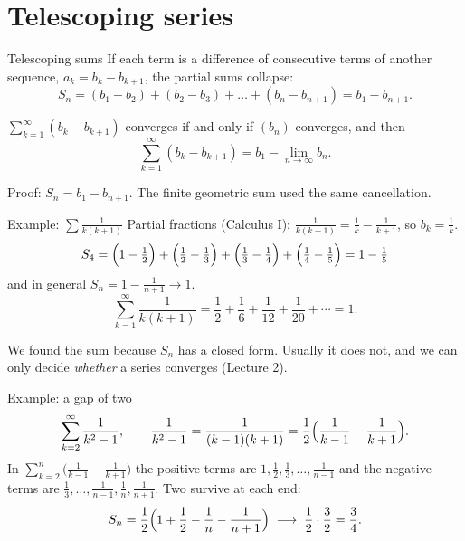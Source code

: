 \documentclass{wosm-slides}
\begin{document}
\section{Telescoping series}

\begin{frame}{Telescoping sums}
  If each term is a difference of consecutive terms of another sequence,
  $a_k = b_k - b_{k+1}$, the partial sums collapse:
  \[ S_n = (b_1 - b_2) + (b_2 - b_3) + \dots + (b_n - b_{n+1}) = b_1 - b_{n+1} . \]
  \pause
  \begin{theorem}
    $\sum_{k=1}^\infty (b_k - b_{k+1})$ converges if and only if $(b_n)$ converges, and then
    \[ \sum_{k=1}^\infty (b_k - b_{k+1}) = b_1 - \lim_{n\to\infty} b_n . \]
  \end{theorem}
  {\small Proof: $S_n = b_1 - b_{n+1}$. \quad
  The finite geometric sum used the same cancellation.\par}
\end{frame}

\begin{frame}{Example: $\sum \frac{1}{k(k+1)}$}
  Partial fractions (Calculus I): \quad
  $\displaystyle\frac{1}{k(k+1)} = \frac1k - \frac1{k+1}$, \quad so $b_k = \frac1k$.
  \pause
  \[ S_4 = \Bigl(1 - \tfrac12\Bigr) + \Bigl(\tfrac12 - \tfrac13\Bigr)
         + \Bigl(\tfrac13 - \tfrac14\Bigr) + \Bigl(\tfrac14 - \tfrac15\Bigr)
         = 1 - \tfrac15 \]
  and in general $S_n = 1 - \frac{1}{n+1} \to 1$.
  \pause
  \[ \sum_{k=1}^\infty \frac{1}{k(k+1)} = \frac12 + \frac16 + \frac1{12} + \frac1{20} + \cdots = 1 . \]
  {\small\color{wosm-muted} We found the sum because $S_n$ has a closed form. Usually it does
  not, and we can only decide \emph{whether} a series converges (Lecture 2).\par}
\end{frame}

\begin{frame}{Example: a gap of two}
  \[ \sum_{k=2}^\infty \frac{1}{k^2 - 1}, \qquad
     \frac{1}{k^2-1} = \frac{1}{(k-1)(k+1)} = \frac12\Bigl(\frac{1}{k-1} - \frac{1}{k+1}\Bigr). \]
  \pause
  In $\sum_{k=2}^{n} \bigl(\frac{1}{k-1} - \frac{1}{k+1}\bigr)$ the positive terms are
  $1, \frac12, \frac13, \dots, \frac1{n-1}$ and the negative terms are
  $\frac13, \dots, \frac1{n-1}, \frac1n, \frac1{n+1}$. Two survive at each end:
  \[ S_n = \frac12\Bigl(1 + \frac12 - \frac1n - \frac1{n+1}\Bigr)
     \;\longrightarrow\; \frac12 \cdot \frac32 = \frac34 . \]
\end{frame}
\end{document}
